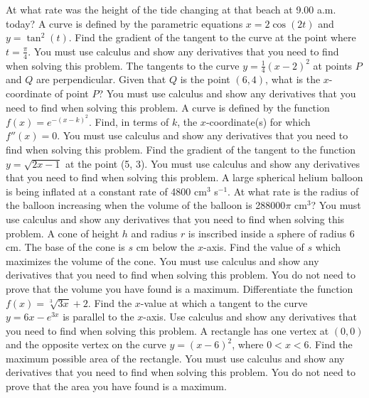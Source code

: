 \documentclass[12pt,addpoints]{exam}
\begin{document}
\begin{questions}
At what rate was the height of the tide changing at that beach at 9.00 a.m. today?
\fillwithlines{5cm}
\question[5] A curve is defined by the parametric equations \( x = 2\cos(2t) \) and \( y = \tan^2(t) \). Find the gradient of the tangent to the curve at the point where \( t = \frac{\pi}{4} \). You must use calculus and show any derivatives that you need to find when solving this problem.
\fillwithlines{5cm}
\question[5] The tangents to the curve \( y = \frac{1}{4}(x-2)^2 \) at points \( P \) and \( Q \) are perpendicular. Given that \( Q \) is the point \( (6, 4) \), what is the \( x \)-coordinate of point \( P \)? You must use calculus and show any derivatives that you need to find when solving this problem.
\fillwithlines{5cm}
\question[5] A curve is defined by the function \( f(x) = e^{-(x-k)^2} \). Find, in terms of \( k \), the \( x \)-coordinate(s) for which \( f''(x) = 0 \). You must use calculus and show any derivatives that you need to find when solving this problem.
\fillwithlines{5cm}
\question[5] Find the gradient of the tangent to the function \( y = \sqrt{2x - 1} \) at the point (5, 3). You must use calculus and show any derivatives that you need to find when solving this problem.
\fillwithlines{5cm}
\question[5] A large spherical helium balloon is being inflated at a constant rate of 4800 cm\(^3\) s\(^{-1}\). At what rate is the radius of the balloon increasing when the volume of the balloon is 288000\(\pi\) cm\(^3\)? You must use calculus and show any derivatives that you need to find when solving this problem.
\fillwithlines{5cm}
\question[5] A cone of height \( h \) and radius \( r \) is inscribed inside a sphere of radius 6 cm. The base of the cone is \( s \) cm below the \( x \)-axis. Find the value of \( s \) which maximizes the volume of the cone. You must use calculus and show any derivatives that you need to find when solving this problem. You do not need to prove that the volume you have found is a maximum.
\fillwithlines{5cm}
\question[5] Differentiate the function \( f(x) = \sqrt[3]{3x} + 2 \).
\fillwithlines{5cm}
\question[5] Find the \( x \)-value at which a tangent to the curve \( y = 6x - e^{3x} \) is parallel to the \( x \)-axis. Use calculus and show any derivatives that you need to find when solving this problem.
\fillwithlines{5cm}
\question[5] A rectangle has one vertex at \((0,0)\) and the opposite vertex on the curve \(y = (x - 6)^2\), where \(0 < x < 6\). Find the maximum possible area of the rectangle. You must use calculus and show any derivatives that you need to find when solving this problem. You do not need to prove that the area you have found is a maximum.

\end{questions}
\end{document}
